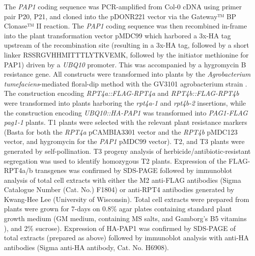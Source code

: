 The \textit{PAP1} coding sequence was PCR-amplified from Col-0 cDNA using primer pair P20, P21, and cloned into the pDONR221 vector via the Gateway™ BP Clonase™ II reaction. The \textit{PAP1} coding sequence was then recombined in-frame into the plant transformation vector pMDC99 which harbored a 3x-HA tag upstream of the recombination site (resulting in a 3x-HA tag, followed by a short linker RSSRGVHHMITTTLYTKVEMK, followed by the initiator methionine for PAP1) driven by a \textit{UBQ10} promoter. This was accompanied by a hygromycin B resistance gene. All constructs were transformed into plants by the \textit{Agrobacterium tumefaciens}-mediated floral-dip method with the GV3101 agrobacterium strain \citep{clough98, gelvin03, zhang06}. The construction encoding \textit{RPT4a::FLAG-RPT4a} and \textit{RPT4b::FLAG-RPT4b} were transformed into plants harboring the \textit{rpt4a-1} and \textit{rpt4b-2} insertions, while the construction encoding \textit{UBQ10::HA-PAP1} was transformed into \textit{PAG1-FLAG pag1-1} plants. T1 plants were selected with the relevant plant resistance markers (Basta for both the \textit{RPT4a} pCAMBIA3301 vector and the \textit{RPT4b} pMDC123 vector, and hygromycin for the \textit{PAP1} pMDC99 vector). T2, and T3 plants were generated by self-pollination. T3 progeny analysis of herbicide/antibiotic-resistant segregation was used to identify homozygous T2 plants. Expression of the FLAG-RPT4a/b transgenes was confirmed by SDS-PAGE followed by immunoblot analysis of total cell extracts with either the M2 anti-FLAG antibodies (Sigma Catalogue Number (Cat. No.) F1804) or anti-RPT4 antibodies generated by Kwang-Hee Lee (University of Wisconsin). Total cell extracts were prepared from plants were grown for 7-days on 0.8\% agar plates containing standard plant growth medium (GM medium, containing MS salts, and Gamborg’s B5 vitamins \citep{gamborg68, julio06, murashige62}), and 2\% sucrose). Expression of HA-PAP1 was confirmed by SDS-PAGE of total extracts (prepared as above) followed by immunoblot analysis with anti-HA antibodies (Sigma anti-HA antibody, Cat. No. H6908).

